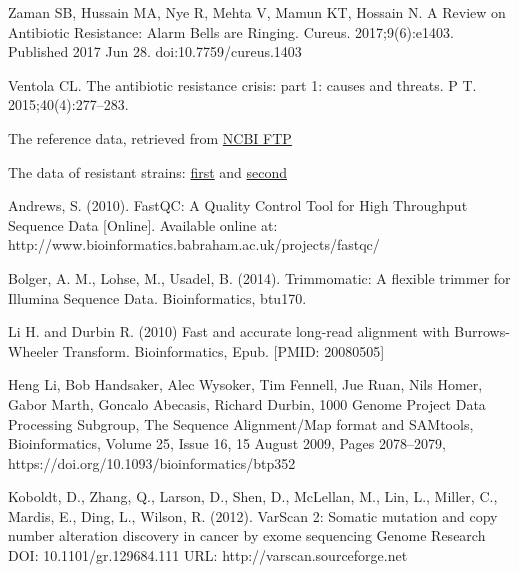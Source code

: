 \documentclass{article}
\begin{document}
\newpage
\begin{thebibliography}{9}

Zaman SB, Hussain MA, Nye R, Mehta V, Mamun KT, Hossain N. A Review on Antibiotic Resistance: Alarm Bells are Ringing. Cureus. 2017;9(6):e1403. Published 2017 Jun 28. doi:10.7759/cureus.1403 

Ventola CL. The antibiotic resistance crisis: part 1: causes and threats. P T. 2015;40(4):277–283. 

The reference data, retrieved  from \href{ftp://ftp.ncbi.nlm.nih.gov/genomes/all/GCA/000/005/845/GCA_000005845.2_ASM584v2}{NCBI FTP}
 
 
The data of resistant strains:  \href{http://public.dobzhanskycenter.ru/mrayko/amp_res_1.fastq.zip}{first} and 
\href{http://public.dobzhanskycenter.ru/mrayko/amp_res_2.fastq.zip}{second} 

Andrews, S. (2010). FastQC:  A Quality Control Tool for High Throughput Sequence Data [Online]. Available online at: http://www.bioinformatics.babraham.ac.uk/projects/fastqc/

Bolger, A. M., Lohse, M., Usadel, B. (2014). Trimmomatic: A flexible trimmer for Illumina Sequence Data. Bioinformatics, btu170.

Li H. and Durbin R. (2010) Fast and accurate long-read alignment with Burrows-Wheeler Transform. Bioinformatics, Epub. [PMID: 20080505] 

Heng Li, Bob Handsaker, Alec Wysoker, Tim Fennell, Jue Ruan, Nils Homer, Gabor Marth, Goncalo Abecasis, Richard Durbin, 1000 Genome Project Data Processing Subgroup, The Sequence Alignment/Map format and SAMtools, Bioinformatics, Volume 25, Issue 16, 15 August 2009, Pages 2078–2079, https://doi.org/10.1093/bioinformatics/btp352

Koboldt, D., Zhang, Q., Larson, D., Shen, D., McLellan, M., Lin, L., Miller, C., Mardis, E., Ding, L., Wilson, R. (2012). VarScan 2: Somatic mutation and copy number alteration discovery in cancer by exome sequencing Genome Research DOI: 10.1101/gr.129684.111
URL: http://varscan.sourceforge.net 


\end{thebibliography}
\end{document}
